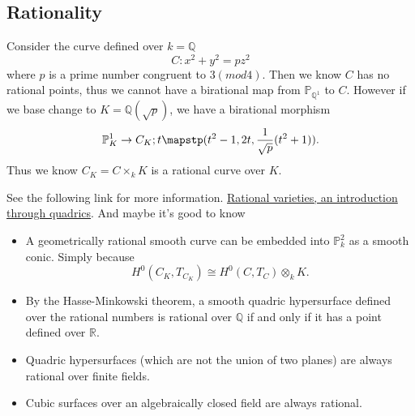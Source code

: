 \documentclass[../main.tex]{subfiles}
\begin{document}
\subsection{Rationality}
\begin{example}
Consider the curve defined over $k=\mathbb{Q}$
$$C:x^{2}+y^{2}=pz^{2}$$
where $p$ is a prime number congruent to $3(mod 4)$. Then we know $C$ has no rational points, thus we cannot have a birational map from $\mathbb{P}_{\mathbb{Q}^{1}}$ to $C$. However if we base change to  $K=\mathbb{Q}(\sqrt{p})$, we have a birational morphism
$$\mathbb{P}_{K}^{1}\rightarrow C_{K}; t\mapstp (t^{2}-1,2t, \frac{1}{\sqrt{p}}(t^{2}+1)).$$
Thus we know $C_{K}=C\times_{k}K$ is a rational curve over $K$.
\end{example}
\begin{remark}
See the following link for more information.
\href{https://rigtriv.wordpress.com/2008/09/27/rational-varieties-an-introduction-through-quadrics/}{Rational varieties, an introduction through quadrics}. And maybe it's good to know 
\begin{itemize}
\item A geometrically rational smooth curve can be embedded into $\mathbb{P}_{k}^{2}$ as a smooth conic. Simply because 
$$H^{0}(C_{K}, T_{C_{K}})\cong H^{0}(C,T_{C})\otimes_{k}K.$$
\item By the Hasse-Minkowski theorem, a smooth quadric hypersurface defined over the rational numbers is rational over $\mathbb{Q}$ if and only if it has a point defined over $\mathbb{R}$.
\item Quadric hypersurfaces (which are not the union of two planes) are always rational over finite fields.
\item Cubic surfaces over an algebraically closed field are always rational.
\end{itemize}
\end{remark}
\end{document}
